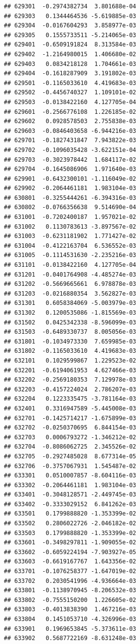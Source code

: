\documentclass[ignorenonframetext,]{beamer}
\begin{document}
\begin{frame}[fragile]
\begin{verbatim}
## 629301  -0.2974382734  3.801688e-04
## 629303   0.1344464536 -5.619885e-03
## 629304  -0.0167604293  3.858977e-03
## 629305   0.1555733511 -5.214065e-03
## 629401  -0.6509191824  8.313584e-03
## 629402  -1.2164980015  1.406680e-02
## 629403   0.0834218128  1.704661e-03
## 629404  -0.1618287909  3.191802e-03
## 629501  -0.1165033610  4.419683e-03
## 629502  -0.4456740327  1.109101e-02
## 629503  -0.0138422160  4.127705e-04
## 629601  -0.2566776108  1.226185e-02
## 629602   0.0928578503  2.755838e-03
## 629603  -0.0846403658 -6.944216e-03
## 629701  -0.1827431847  7.943822e-03
## 629702  -0.1096035428 -3.622151e-04
## 629703  -0.3023978442  1.684117e-02
## 629704  -0.1645086906  1.971640e-03
## 629901  -0.6432300101 -1.116049e-02
## 629902  -0.2064461181  1.983104e-03
## 630801  -0.3255444261 -6.394316e-03
## 630802  -0.0766356638  9.514690e-04
## 631001  -0.7202400187  1.957021e-02
## 631002   0.1130783613 -3.897567e-02
## 631003  -0.6231181902  1.771427e-02
## 631004  -0.4122163704  6.536552e-03
## 631005  -0.1114531630 -2.235216e-03
## 631101  -0.0138422160  4.127705e-04
## 631201  -0.0401764908 -4.485274e-03
## 631202  -0.5669665661  6.978878e-03
## 631203  -0.0216880354  3.562827e-03
## 631301   0.6058384069 -5.003979e-03
## 631302   0.1200535086 -1.815569e-03
## 631502   0.0425342338 -8.596099e-03
## 631503  -0.6489330737  8.005056e-03
## 631801  -0.1034973330  7.659985e-03
## 631802  -0.1165033610  4.419683e-03
## 632101   0.1029599867  1.229523e-02
## 632201  -0.6194061953  4.627466e-03
## 632202  -0.2569180353  7.129978e-03
## 632203  -0.4157224024  2.786207e-03
## 632204   0.1223335475 -3.781164e-03
## 632401   0.3316947589 -5.445008e-03
## 632701  -0.1425714217 -1.675899e-03
## 632702  -0.0250370695  6.844154e-03
## 632703   0.0006793272 -1.346212e-02
## 632704  -0.8086062725  2.345526e-02
## 632705  -0.2927485028  8.677314e-05
## 632706  -0.3757067931  1.545487e-02
## 633301   0.0510007857 -8.604116e-03
## 633302  -0.2064461181  1.983104e-03
## 633401  -0.3048128571 -2.449745e-03
## 633402  -0.3333029152  6.841262e-03
## 633501   0.1799888820 -1.353399e-02
## 633502   0.2806022726 -2.046182e-02
## 633503   0.1799888820 -1.353399e-02
## 633601  -0.3498297811 -1.909055e-02
## 633602  -0.6059224194 -7.903927e-05
## 633603  -0.6619167767  1.643356e-02
## 633701  -0.1076258377 -1.647019e-02
## 633702   0.2030541996 -4.936664e-03
## 633801  -0.1138970945 -8.206532e-03
## 633802  -0.7555150200  1.226605e-02
## 633803  -0.4013838390  1.467216e-03
## 633804   0.1451053710 -4.326996e-03
## 633901   0.1969653845 -5.373611e-03
## 633902   0.5687722169 -8.631248e-03

\end{verbatim}
\end{frame}
\end{document}
